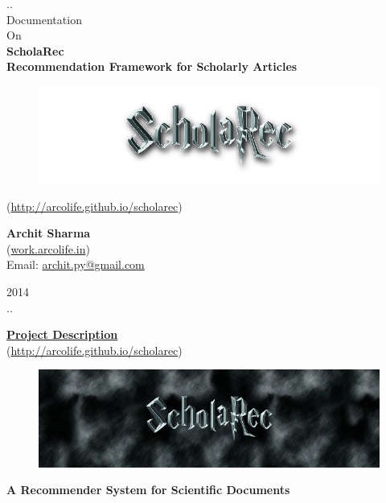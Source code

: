 \documentclass[a4 paper,11pt]{report}
\begin{document}
\begin {center}
\thispagestyle{empty}
..\\[30pt]
Documentation\\[10pt]
On\\[20pt]\textbf {\LARGE ScholaRec \\Recommendation Framework for Scholarly Articles}\\[60pt]

\begin {figure}[htb]
  \begin {center}
    \includegraphics[scale=0.5]{logo.png}
    \label {The Process}
  \end {center}
\end {figure}

(\url{http://arcolife.github.io/scholarec})\\[140pt]

\begin {flushright}
\textbf {Archit Sharma}\\
(\url{work.arcolife.in})\\
Email: \href{mailto:archit.py@gmail.com}{archit.py@gmail.com}\\[30pt]
\end {flushright}

2014\\[50pt]
..\\
\end{center}
\newpage
\thispagestyle{empty}
\tableofcontents
\newpage
\setcounter{page}{1}

\begin {center}
\underline{\Large \textbf {Project Description}}\\
(\url{http://arcolife.github.io/scholarec})\\
\begin {figure}[h]
\centering \includegraphics[scale=0.5]{scholarecLogo1}
\end {figure}
\textbf {A Recommender System for Scientific Documents}\\[50pt]
\end {center}
\end{document}
